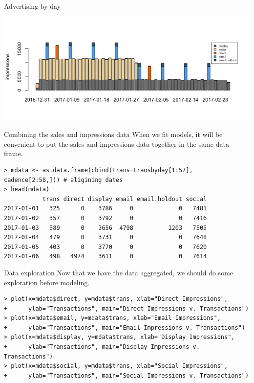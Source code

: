 \documentclass[10pt, aspectratio=169]{beamer}
\begin{document}
\begin{frame}{Advertising by day}
\begin{center}
\includegraphics[width=.85\textwidth]{images/cadence.png}
\end{center}
\end{frame}

\begin{frame}[fragile]{Combining the sales and impressions data}
When we fit models, it will be convenient to put the sales and impressions data together in the same data frame. 
\begin{lstlisting}
> mdata <- as.data.frame(cbind(trans=transbyday[1:57], cadence[2:58,])) # aligining dates
> head(mdata)
           trans direct display email email.holdout social
2017-01-01   325      0    3786     0             0   7481
2017-01-02   357      0    3792     0             0   7416
2017-01-03   589      0    3656  4798          1203   7505
2017-01-04   479      0    3731     0             0   7648
2017-01-05   403      0    3770     0             0   7620
2017-01-06   498   4974    3611     0             0   7614\end{lstlisting}
\end{frame} 

\begin{frame}[fragile]{Data exploration}
Now that we have the data aggregated, we should do some exploration before modeling. 
\begin{lstlisting}
> plot(x=mdata$direct, y=mdata$trans, xlab="Direct Impressions", 
+      ylab="Transactions", main="Direct Impressions v. Transactions")
> plot(x=mdata$email, y=mdata$trans, xlab="Email Impressions", 
+      ylab="Transactions", main="Email Impressions v. Transactions")
> plot(x=mdata$display, y=mdata$trans, xlab="Display Impressions", 
+      ylab="Transactions", main="Display Impressions v. Transactions")
> plot(x=mdata$social, y=mdata$trans, xlab="Social Impressions", 
+      ylab="Transactions", main="Social Impressions v. Transactions")
\end{lstlisting}
\end{frame}
\end{document}
